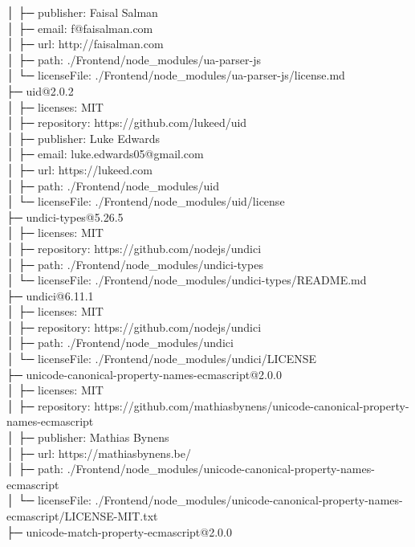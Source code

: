 │  ├─ publisher: Faisal Salman\\
│  ├─ email: f@faisalman.com\\
│  ├─ url: http://faisalman.com\\
│  ├─ path: ./Frontend/node\_modules/ua-parser-js\\
│  └─ licenseFile: ./Frontend/node\_modules/ua-parser-js/license.md\\
├─ uid@2.0.2\\
│  ├─ licenses: MIT\\
│  ├─ repository: https://github.com/lukeed/uid\\
│  ├─ publisher: Luke Edwards\\
│  ├─ email: luke.edwards05@gmail.com\\
│  ├─ url: https://lukeed.com\\
│  ├─ path: ./Frontend/node\_modules/uid\\
│  └─ licenseFile: ./Frontend/node\_modules/uid/license\\
├─ undici-types@5.26.5\\
│  ├─ licenses: MIT\\
│  ├─ repository: https://github.com/nodejs/undici\\
│  ├─ path: ./Frontend/node\_modules/undici-types\\
│  └─ licenseFile: ./Frontend/node\_modules/undici-types/README.md\\
├─ undici@6.11.1\\
│  ├─ licenses: MIT\\
│  ├─ repository: https://github.com/nodejs/undici\\
│  ├─ path: ./Frontend/node\_modules/undici\\
│  └─ licenseFile: ./Frontend/node\_modules/undici/LICENSE\\
├─ unicode-canonical-property-names-ecmascript@2.0.0\\
│  ├─ licenses: MIT\\
│  ├─ repository: https://github.com/mathiasbynens/unicode-canonical-property-names-ecmascript\\
│  ├─ publisher: Mathias Bynens\\
│  ├─ url: https://mathiasbynens.be/\\
│  ├─ path: ./Frontend/node\_modules/unicode-canonical-property-names-ecmascript\\
│  └─ licenseFile: ./Frontend/node\_modules/unicode-canonical-property-names-ecmascript/LICENSE-MIT.txt\\
├─ unicode-match-property-ecmascript@2.0.0\\
